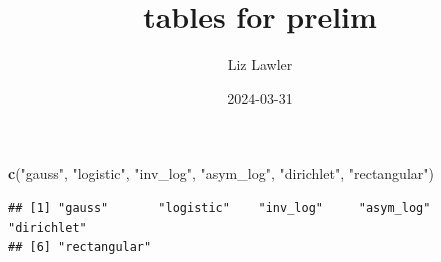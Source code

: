 \documentclass[
]{article}
\title{tables for prelim}
\author{Liz Lawler}
\date{2024-03-31}
\newenvironment{Shaded}{\begin{snugshade}}{\end{snugshade}}
\newcommand{\FunctionTok}[1]{\textcolor[rgb]{0.13,0.29,0.53}{\textbf{#1}}}
\newcommand{\NormalTok}[1]{#1}
\newcommand{\StringTok}[1]{\textcolor[rgb]{0.31,0.60,0.02}{#1}}
\begin{document}
\maketitle

\begin{Shaded}
\begin{Highlighting}[]
\FunctionTok{c}\NormalTok{(}\StringTok{"gauss"}\NormalTok{, }\StringTok{"logistic"}\NormalTok{, }\StringTok{"inv\_log"}\NormalTok{, }\StringTok{"asym\_log"}\NormalTok{, }\StringTok{"dirichlet"}\NormalTok{, }\StringTok{"rectangular"}\NormalTok{) }
\end{Highlighting}
\end{Shaded}

\begin{verbatim}
## [1] "gauss"       "logistic"    "inv_log"     "asym_log"    "dirichlet"  
## [6] "rectangular"
\end{verbatim}
\end{document}
